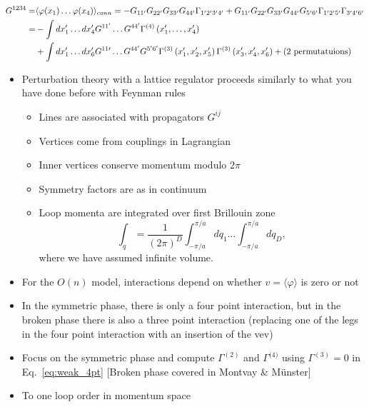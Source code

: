 \begin{equation}
\begin{aligned}
G^{1234} =& \langle \varphi(x_1) \ldots \varphi(x_4) \rangle_{conn} = -G_{1 1^\prime}G_{2 2^\prime}G_{3 3^\prime}G_{4 4^\prime}\Gamma_{1^\prime2^\prime3^\prime4^\prime} + G_{1 1^\prime}G_{2 2^\prime}G_{3 3^\prime}G_{4 4^\prime}G_{5^\prime 6^\prime}\Gamma_{1^\prime 2^\prime 5^\prime} \Gamma_{3^\prime 4^\prime 6^\prime}\\
=&-\int d x_{1}^{\prime} \ldots d x_{4}^{\prime} G^{1 1^{\prime}} \ldots G^{44^{\prime}} \Gamma^{(4)}\left(x_{1}^{\prime}, \ldots, x_{4}^{\prime}\right) \\
& +\int d x_{1}^{\prime} \ldots d x_{6}^{\prime} G^{1 1 \prime} \ldots G^{44^{\prime}} G^{5^{\prime} 6^{\prime}} \Gamma^{(3)}\left(x_{1}^{\prime}, x_{2}^{\prime}, x_{5}^{\prime}\right) \Gamma^{(3)}\left(x_{3}^{\prime},x_{4}^{\prime}, x_{6}^{\prime}\right) + (2\ {\rm permutatuions})
\end{aligned}
\label{eq:weak_4pt}
\end{equation}

\begin{itemize}
  \item Perturbation theory with a lattice regulator proceeds similarly to what you have done before with Feynman rules
  \begin{itemize}
  \item Lines are associated with propagators \(G^{i j}\)
  \item Vertices come from couplings in Lagrangian
  \item Inner vertices conserve momentum modulo $2 \pi$
  \item Symmetry factors are as in continuum
  \item Loop momenta are integrated over first Brillouin zone
\begin{equation}
\int_{q}=\frac{1}{(2 \pi)^{D}} \int_{-\pi / a}^{\pi / a} d q_1 \ldots \int_{-\pi / a}^{\pi / a} dq_{D},
\end{equation}
where we have assumed infinite volume.
  \end{itemize}

  \item For the \(O(n)\) model, interactions depend on whether \(v=\langle\varphi\rangle\) is zero or not\\
  \item In the symmetric phase, there is only a four point interaction, but in the broken phase there is also a three point interaction (replacing one of the legs in the four point interaction with an insertion of the vev)
  \item Focus on the symmetric phase and compute \(\Gamma^{(2)}\) and \(\Gamma^{\text {(4)}}\) using $\Gamma^{(3)}=0$ in Eq.~\eqref{eq:weak_4pt}
[Broken phase covered in Montvay \& M\"unster]
  \item To one loop order in momentum space
\end{itemize}


